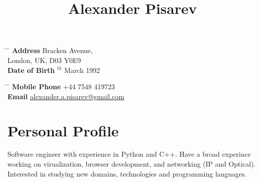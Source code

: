 \documentclass[9pt]{article} %
\begin{document}

\title{Alexander Pisarev} %


\parbox{0.5\textwidth}{ %
\begin{tabbing} %
\hspace{3cm} \= \hspace{4cm} \= \kill %
{\bf Address}  Bracken Avenue,\\ %
\> London, UK, D03 Y0E9 \\ %
{\bf Date of Birth} $^{th}$ March 1992 \\ %
\end{tabbing}}
\hfill %
\parbox{0.5\textwidth}{ %
\begin{tabbing} %
\hspace{3cm} \= \hspace{4cm} \= \kill %
{\bf Mobile Phone} \> +44 7548 419723 \\ %
{\bf Email} \> \href{mailto:alexander.a.pisarev@gmail.com}{alexander.a.pisarev@gmail.com} \\ %
\end{tabbing}}
\vspace{-4mm}


\section{Personal Profile}

Software engineer with experience in Python and C++. Have a broad experince working on virualization, 
browser development, and networking (IP and Optical). Interested in studying new domains, technologies 
and programming languages.

\end{document}

